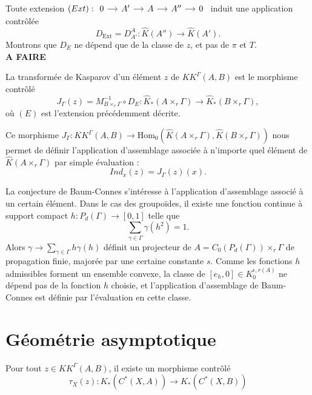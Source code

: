 Toute extension $(Ext):\begin{tikzcd}[column sep = small]0\arrow{r}& A' \arrow{r} & A \arrow{r} & A'' \arrow{r} & 0\end{tikzcd}$ induit une application contrôlée 
\[D_{\text{Ext}}=D_{A'}^A : \hat K(A'') \rightarrow \hat K(A'). \]
Montrons que $D_{E}$ ne dépend que de la classe de $z$, et pas de $\pi$ et $T$.\\
\textbf{A FAIRE}\\

\begin{definition}
La transformée de Kasparov d'un élément $z$ de $KK^\Gamma(A,B)$ est le morphisme contrôlé 
\[J_\Gamma (z) = M_{B\times_r \Gamma}^{-1} \circ D_E : \hat K_*(A\times_r \Gamma)\rightarrow \hat K_* (B\times_r \Gamma),\]
où $(E)$ est l'extension précédemment décrite.
\end{definition}

Ce morphisme $J_\Gamma : KK^\Gamma(A,B)\rightarrow \text{Hom}_0(\hat K(A\times_r \Gamma),\hat K(B\times_r \Gamma))$ nous permet de définir l'application d'assemblage associée à n'importe quel élément de $\hat K(A\times_r \Gamma)$ par simple évaluation :
\[Ind_x (z)= J_\Gamma ( z ) (x).\]

La conjecture de Baum-Connes s'intéresse à l'application d'assemblage associé à un certain élément. Dans le cas des groupoïdes, il existe une fonction continue à support compact $h :P_d(\Gamma) \rightarrow [0,1]$ telle que 
\[\sum_{\gamma\in \Gamma} \gamma (h^2)=1.\]
Alors $ \gamma \rightarrow \sum_{\gamma\in \Gamma} h \gamma(h)$ définit un projecteur de $A=C_0(P_d(\Gamma))\times_r \Gamma$ de propagation finie, majorée par une certaine constante $s$. Comme les fonctions $h$ admissibles forment un ensemble convexe, la classe de $[e_h, 0]\in K_0^{\epsilon,r (A)}$ ne dépend pas de la fonction $h$ choisie, et l'application d'assemblage de Baum-Connes est définie par l'évaluation en cette classe.

\section{Géométrie asymptotique}

Pour tout $z\in KK^\Gamma(A,B)$, il existe un morphisme contrôlé \[\tau_X (z) : K_*(C^*(X,A))\rightarrow K_*(C^*(X,B)) \]